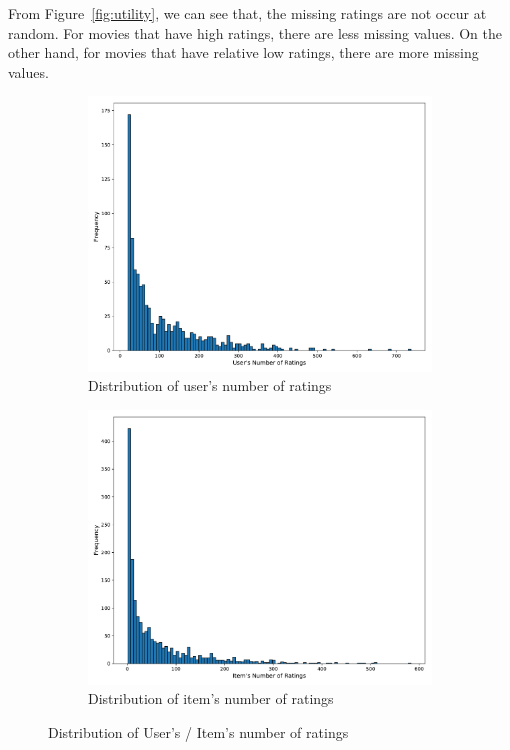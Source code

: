 From Figure~\ref{fig:utility}, we can see that, the missing ratings are not occur at random. For movies that have high ratings, there are less missing values. On the other hand, for movies that have relative low ratings, there are more missing values. 

\begin{figure}[htbp]
\centering
\begin{subfigure}[b]{0.5\linewidth}
  \includegraphics[width=1.00\textwidth]{./figures/user_frequency.pdf}
  \caption{Distribution of user's number of ratings}
   \label{ex_without_source}
\end{subfigure}%
\begin{subfigure}[b]{0.5\linewidth}
  \centering
  \includegraphics[width=1.00\textwidth]{./figures/item_frequency.pdf}
  \caption{Distribution of item's number of ratings}
  \label{ex_with_source}
\end{subfigure}%
\raggedright
\caption{Distribution of User's / Item's number of ratings}
\label{fig:source_injection1}
\end{figure}

